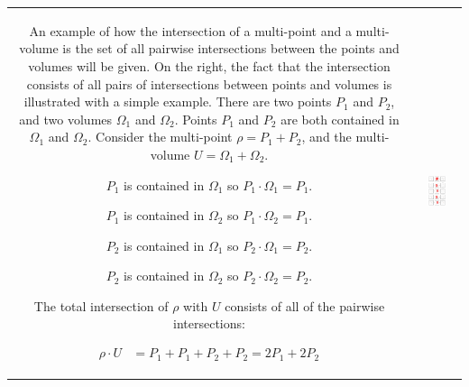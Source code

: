 \begin{center}
\begin{tabular}{cc}
\parbox{0.5\textwidth}{
An example of how the intersection of a multi-point and a multi-volume is the set of all pairwise intersections between the points and volumes will be given. On the right, the fact that the intersection consists of all pairs of intersections between points and volumes is illustrated with a simple example. There are two points \(P_1\) and \(P_2\), and two volumes \(\Omega_1\) and \(\Omega_2\). Points \(P_1\) and \(P_2\) are both contained in \(\Omega_1\) and \(\Omega_2\). Consider the multi-point \(\rho = P_1 + P_2\), and the multi-volume \(U = \Omega_1 + \Omega_2\). 

\(P_1\) is contained in \(\Omega_1\) so \(P_1 \cdot \Omega_1 = P_1\).  

\(P_1\) is contained in \(\Omega_2\) so \(P_1 \cdot \Omega_2 = P_1\).

\(P_2\) is contained in \(\Omega_1\) so \(P_2 \cdot \Omega_1 = P_2\).

\(P_2\) is contained in \(\Omega_2\) so \(P_2 \cdot \Omega_2 = P_2\).

The total intersection of \(\rho\) with \(U\) consists of all of the pairwise intersections:

\begin{align*}
\rho \cdot U & = P_1 + P_1 + P_2 + P_2 
= 2P_1 + 2P_2  
\end{align*}
} & \parbox{0.5\textwidth}{
\includegraphics[width = 0.5\textwidth]{Intersections/Point-volume_intersections/point_volume_intersection_distributive_law}
}
\end{tabular}
\end{center} 

